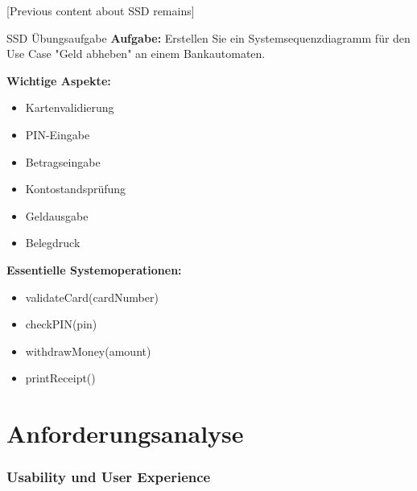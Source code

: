 [Previous content about SSD remains]

\begin{example}{SSD Übungsaufgabe}
\textbf{Aufgabe:} Erstellen Sie ein Systemsequenzdiagramm für den Use Case "Geld abheben" an einem Bankautomaten.

\textbf{Wichtige Aspekte:}
\begin{itemize}
    \item Kartenvalidierung
    \item PIN-Eingabe
    \item Betragseingabe
    \item Kontostandsprüfung
    \item Geldausgabe
    \item Belegdruck
\end{itemize}

\textbf{Essentielle Systemoperationen:}
\begin{itemize}
    \item validateCard(cardNumber)
    \item checkPIN(pin)
    \item withdrawMoney(amount)
    \item printReceipt()
\end{itemize}
\end{example}

\section{Anforderungsanalyse}

\subsubsection{Usability und User Experience}

